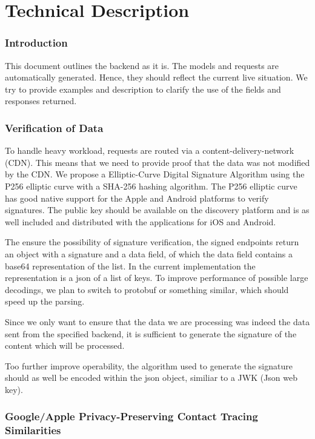 \part{Technical Description}
\section{Introduction}
This document outlines the backend as it is. The models and requests are automatically generated. Hence, they should reflect the current live situation. We try to provide examples and description to clarify the use of the fields and responses returned.

\section{Verification of Data}
To handle heavy workload, requests are routed via a content-delivery-network (CDN). This means that we need to provide proof that the data was not modified by the CDN. We propose a Elliptic-Curve Digital Signature Algorithm using the P256 elliptic curve with a SHA-256 hashing algorithm. The P256 elliptic curve has good native support for the Apple and Android platforms to verify signatures. The public key should be available on the discovery platform and is as well included and distributed with the applications for iOS and Android.

The ensure the possibility of signature verification, the signed endpoints return an object with a signature and a data field, of which the data field contains a base64 representation of the list. In the current implementation the representation is a json of a list of keys. To improve performance of possible large decodings, we plan to switch to protobuf or something similar, which should speed up the parsing.

Since we only want to ensure that the data we are processing was indeed the data sent from the specified backend, it is sufficient to generate the signature of the content which will be processed. 

Too further improve operability, the algorithm used to generate the signature should as well be encoded within the json object, similiar to a JWK (Json web key).

\section{Google/Apple Privacy-Preserving Contact Tracing Similarities}
